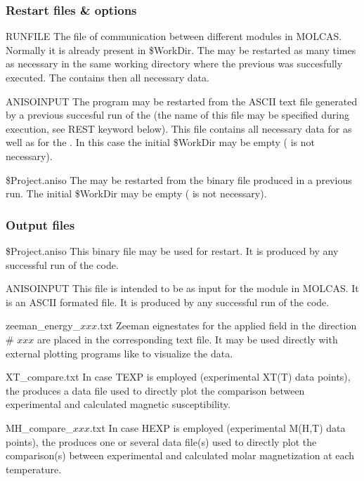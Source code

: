 \subsubsection{Restart files \& options}
\begin{filelist}
\item[RUNFILE]
The file of communication between different modules in MOLCAS. Normally it is already present in \$WorkDir.
The  may be restarted as many times as necessary in the same working directory where the previous  was succesfully executed. The  contains then all necessary data.
\item[ANISOINPUT]
The program may be restarted from the ASCII text file  generated by a previous succesful run of the  (the name of this file may be specified during execution, see REST keyword below). This file contains all necessary data for  as well as for the . In this case the initial \$WorkDir may be empty ( is not necessary).
\item[\$Project.aniso]
The  may be restarted from the binary file  produced in a previous run. The initial \$WorkDir may be empty ( is not necessary).
\end{filelist}

\subsubsection{Output files}
\begin{filelist}
\item[\$Project.aniso]
This binary file may be used for restart. It is produced by any successful run of the code.
\item[ANISOINPUT]
This file is intended to be as input for the  module in MOLCAS. It is an ASCII formated file. It is produced by any successful run of the code.
\item[zeeman\_energy\_$xxx$.txt]
Zeeman eignestates for the applied field in the direction \# $xxx$ are placed in the corresponding text file. It may be used directly with external plotting programs like  to visualize the data.
\item[XT\_compare.txt]
In case TEXP is employed (experimental XT(T) data points), the  produces a data file used to directly plot the comparison between experimental and calculated magnetic susceptibility.
\item[MH\_compare\_$xxx$.txt]
In case HEXP is employed (experimental M(H,T) data points), the  produces one or several data file(s) used to directly plot the comparison(s) between experimental and calculated molar magnetization at each temperature.
\end{filelist}

